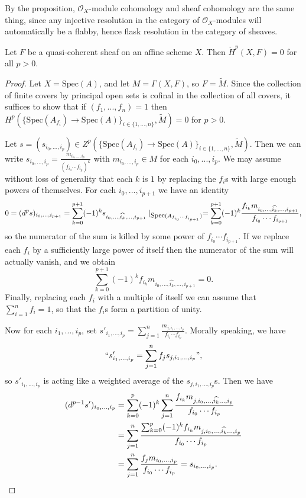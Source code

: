 By the proposition, $\mathcal{O}_X$-module cohomology and sheaf cohomology are the same thing, since any injective resolution in the category of $\mathcal{O}_X$-modules will automatically be a flabby, hence flask resolution in the category of sheaves.

\begin{lem}\label{poincare} Let $F$ be a quasi-coherent sheaf on an affine scheme $X$. Then $\check{H}^p(X,F) = 0$ for all $p > 0$.
\end{lem}
\begin{proof} Let $X=\mbox{Spec}(A)$, and let $M = \Gamma(X,F)$, so $F = \widetilde{M}$. Since the collection of finite covers by principal open sets is cofinal in the collection of all covers, it suffices to show that if $(f_1, ..., f_n) = 1$ then $H^p(\{\mbox{Spec}(A_{f_i})\rightarrow \mbox{Spec}(A)\}_{i\in\{1,...,n\}}, \widetilde{M}) = 0$ for $p>0$.

Let $s = (s_{i_0, ..., i_p}) \in Z^p(\{\mbox{Spec}(A_{f_i})\rightarrow \mbox{Spec}(A)\}_{i\in\{1,...,n\}}, \widetilde{M})$. Then we can write $s_{i_0, ..., i_p} = \frac{m_{i_0, ..., i_p}}{(f_{i_0}\cdots f_{i_p})^k}$ with $m_{i_0, ..., i_p}\in M$ for each $i_0, ..., i_p$. We may assume without loss of generality that each $k$ is $1$ by replacing the $f_i$s with large enough powers of themselves. For each $i_0, ..., i_{p+1}$ we have an identity
\[
0 = (d^ps)_{i_0, ..., i_{p+1}} = \sum_{k=0}^{p+1} (-1)^k s_{i_0, ..., \widehat{i_k}, ..., i_{p+1}}\mid_{\mbox{\small Spec}(A_{f_{i_0}\cdots f_{i_{p+1}}})} = \sum_{k=0}^{p+1} (-1)^k \frac{f_{i_k}m_{i_0, ..., \widehat{i_k}, ..., i_{p+1}}}{f_{i_0}\cdots f_{i_{p+1}}},
\]
so the numerator of the sum is killed by some power of $f_{i_0}\cdots f_{i_{p+1}}$. If we replace each $f_i$ by a sufficiently large power of itself then the numerator of the sum will actually vanish, and we obtain
\[
\sum_{k=0}^{p+1} (-1)^{k} f_{i_k}m_{i_0, ..., \widehat{i_k}, ..., i_{p+1}} = 0.
\]
Finally, replacing each $f_i$ with a multiple of itself we can assume that $\sum_{i=1}^n f_i = 1$, so that the $f_i$s form a partition of unity.

Now for each $i_1, ..., i_{p}$, set $s'_{i_1, ..., i_p} = \sum_{j=1}^n \frac{m_{j, i_1, ..., i_p}}{f_{i_1}\cdots f_{i_p}}$. Morally speaking, we have
\[
``s'_{i_1, ..., i_p} = \sum_{j=1}^n f_js_{j, i_1, ..., i_p}",
\]
so $s'_{i_1, ..., i_p}$ is acting like a weighted average of the $s_{j, i_1, ..., i_p}$s. Then we have
\begin{align*}
(d^{p-1}s')_{i_0, ..., i_p} &= \sum_{k=0}^p (-1)^k \sum_{j=1}^n \frac{f_{i_k}m_{j, i_0, ..., \widehat{i_k} ..., i_p}}{f_{i_0}\cdots f_{i_p}}\\
&= \sum_{j=1}^n \frac{\sum_{k=0}^p (-1)^k f_{i_k}m_{j, i_0, ..., \widehat{i_k} ..., i_p}}{f_{i_0}\cdots f_{i_p}}\\
&= \sum_{j=1}^n \frac{f_jm_{i_0, ..., i_p}}{f_{i_0}\cdots f_{i_p}} = s_{i_0, ..., i_p}.\qedhere
\end{align*}
\end{proof}

